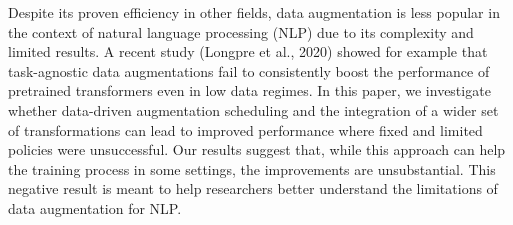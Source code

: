 Despite its proven efficiency in other fields, data augmentation is less popular in the context of natural language processing (NLP) due to its complexity and limited results. A recent study (Longpre et al., 2020) showed for example that task-agnostic data augmentations fail to consistently boost the performance of pretrained transformers even in low data regimes. In this paper, we investigate whether data-driven augmentation scheduling and the integration of a wider set of transformations can lead to improved performance where fixed and limited policies were unsuccessful. Our results suggest that, while this approach can help the training process in some settings, the improvements are unsubstantial. This negative result is meant to help researchers better understand the limitations of data augmentation for NLP.
